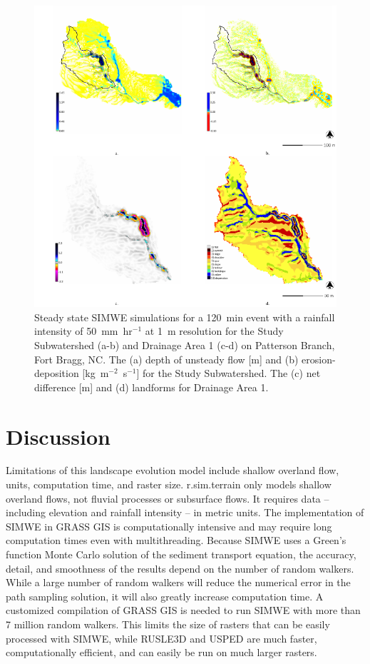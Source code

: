 \documentclass[gmd, manuscript]{copernicus}
\begin{document}
\begin{figure}
\center
\includegraphics[width=\textwidth,height=0.95\textheight,keepaspectratio]{figures/simwe.pdf}
\caption{
Steady state SIMWE simulations 
for a 120~\unit{min} event 
with a rainfall intensity of 50~\unit{mm~hr}$^{-1}$
at 1~\unit{m} resolution for the
Study Subwatershed (a-b)
and Drainage Area 1 (c-d)
on Patterson Branch, Fort Bragg, NC.
The (a) depth of unsteady flow [\unit{m}] and
(b) erosion-deposition [\unit{kg~m}$^{-2}$~\unit{s}$^{-1}$]
for the Study Subwatershed.
The (c) net difference [\unit{m}] and (d) landforms
for Drainage Area 1.
}
\label{fig:simwe_simulation}
\end{figure}

\section{Discussion}

Limitations of this landscape evolution model include
shallow overland flow, units, computation time, and raster size.
r.sim.terrain only models shallow overland flows, 
not fluvial processes or subsurface flows.
It requires data -- including 
elevation and rainfall intensity -- in metric units. 
The implementation of SIMWE in GRASS GIS
is computationally intensive 
and may require long computation times even with multithreading.
Because SIMWE uses a Green's function Monte Carlo solution 
of the sediment transport equation, 
the accuracy, detail, and smoothness of the results 
depend on the number of random walkers.
While a large number of random walkers will reduce the
numerical error in the path sampling solution,
it will also greatly increase computation time.
A customized compilation of GRASS GIS 
is needed to run SIMWE with more than 7 million random walkers.
This limits the size of rasters 
that can be easily processed with SIMWE,
while RUSLE3D and USPED are much faster, computationally efficient,
and can easily be run on much larger rasters. 
\end{document}
